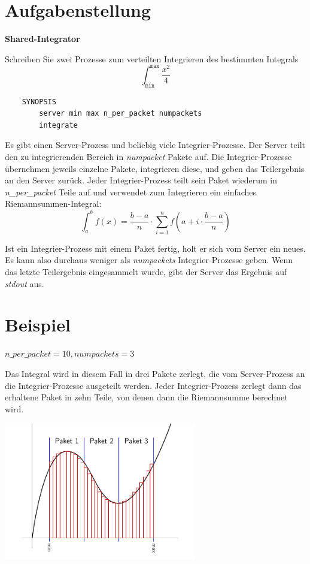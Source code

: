 

\usepackage{graphicx}




\section*{Aufgabenstellung}

\textbf{Shared-Integrator}

Schreiben Sie zwei Prozesse zum verteilten Integrieren des bestimmten Integrals
$$\int^{\mathtt{max}}_{\mathtt{min}} \frac{x^2}{4}$$

\begin{verbatim}
    SYNOPSIS
        server min max n_per_packet numpackets
        integrate
\end{verbatim}

Es gibt einen Server-Prozess und beliebig viele Integrier-Prozesse. Der Server
teilt den zu integrierenden Bereich in \emph{numpacket} Pakete auf. Die
Integrier-Prozesse übernehmen jeweils einzelne Pakete, integrieren diese, und
geben das Teilergebnis an den Server zurück. Jeder Integrier-Prozess teilt sein
Paket wiederum in \emph{n\_per\_packet} Teile auf und verwendet zum Integrieren
ein einfaches Riemannsummen-Integral:
$$\int^b_a f(x) = \frac{b-a}n \cdot \sum_{i=1}^{n} f\left(a + i\cdot \frac{b-a}{n}\right)$$

Ist ein Integrier-Prozess mit einem Paket fertig, holt er sich vom Server ein
neues. Es kann also durchaus weniger als \emph{numpackets} Integrier-Prozesse
geben. Wenn das letzte Teilergebnis eingesammelt wurde, gibt der Server das
Ergebnis auf \emph{stdout} aus.

\section*{Beispiel}

$n\_per\_packet = 10, numpackets = 3$

Das Integral wird in diesem Fall in drei Pakete zerlegt, die vom Server-Prozess
an die Integrier-Prozesse ausgeteilt werden. Jeder Integrier-Prozess zerlegt
dann das erhaltene Paket in zehn Teile, von denen dann die Riemannsumme
berechnet wird.

\begin{center}
\includegraphics[height=6cm]{integfigure.pdf}
\end{center}

